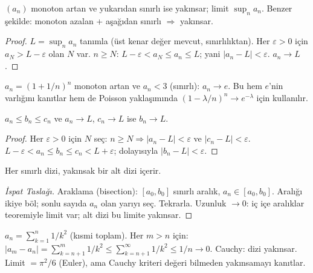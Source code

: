 \begin{teorem}
\label{thm:monoton_dizi}
$(a_n)$ monoton artan ve yukarıdan sınırlı ise yakınsar; limit $\sup_n a_n$.
Benzer şekilde: monoton azalan + aşağıdan sınırlı $\Rightarrow$ yakınsar.
\end{teorem}

\begin{proof}
$L = \sup_n a_n$ tanımla (üst kenar değer mevcut, sınırlılıktan). Her $\varepsilon > 0$ için
$a_N > L - \varepsilon$ olan $N$ var. $n \geq N$: $L - \varepsilon < a_N \leq a_n \leq L$;
yani $|a_n - L| < \varepsilon$. $a_n \to L$.
\end{proof}

\begin{ornek}
$a_n = (1 + 1/n)^n$ monoton artan ve $a_n < 3$ (sınırlı): $a_n \to e$.
Bu hem $e$'nin varlığını kanıtlar hem de Poisson yaklaşımında $(1-\lambda/n)^n \to e^{-\lambda}$ için kullanılır.
\end{ornek}

\begin{teorem}
\label{thm:sikistirma}
$a_n \leq b_n \leq c_n$ ve $a_n \to L$, $c_n \to L$ ise $b_n \to L$.
\end{teorem}

\begin{proof}
Her $\varepsilon > 0$ için $N$ seç: $n \geq N \Rightarrow |a_n - L| < \varepsilon$ ve $|c_n - L| < \varepsilon$.
$L - \varepsilon < a_n \leq b_n \leq c_n < L + \varepsilon$; dolayısıyla $|b_n - L| < \varepsilon$.
\end{proof}

\begin{teorem}
\label{thm:bolzano}
Her sınırlı dizi, yakınsak bir alt dizi içerir.
\end{teorem}

\begin{proof}[İspat Taslağı]
Araklama (bisection): $[a_0, b_0]$ sınırlı aralık, $a_n \in [a_0, b_0]$.
Aralığı ikiye böl; sonlu sayıda $a_n$ olan yarıyı seç. Tekrarla.
Uzunluk $\to 0$: iç içe aralıklar teoremiyle limit var; alt dizi bu limite yakınsar.
\end{proof}

\begin{ornek}
$a_n = \sum_{k=1}^n 1/k^2$ (kısmi toplam). Her $m > n$ için:
$|a_m - a_n| = \sum_{k=n+1}^m 1/k^2 \leq \sum_{k=n+1}^\infty 1/k^2 \leq 1/n \to 0$.
Cauchy: dizi yakınsar. Limit $= \pi^2/6$ (Euler), ama Cauchy kriteri değeri bilmeden yakınsamayı kanıtlar.
\end{ornek}

